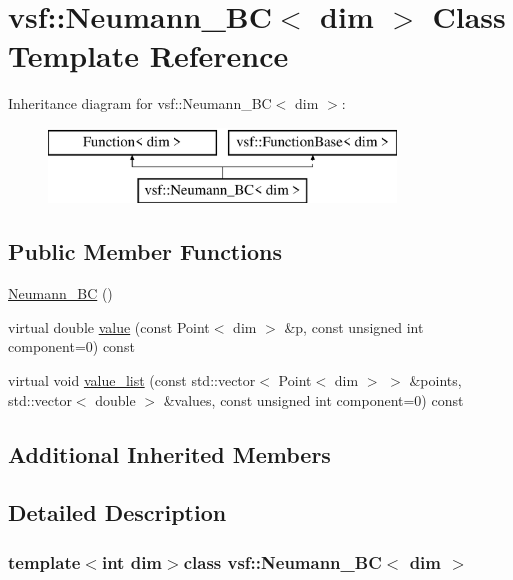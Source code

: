 \hypertarget{classvsf_1_1Neumann__BC}{\section{vsf\-:\-:Neumann\-\_\-\-B\-C$<$ dim $>$ Class Template Reference}
\label{classvsf_1_1Neumann__BC}
}
Inheritance diagram for vsf\-:\-:Neumann\-\_\-\-B\-C$<$ dim $>$\-:\begin{figure}[H]
\begin{center}
\leavevmode
\includegraphics[height=2.000000cm]{classvsf_1_1Neumann__BC}
\end{center}
\end{figure}
\subsection*{Public Member Functions}
\begin{DoxyCompactItemize}
\item 
\hyperlink{classvsf_1_1Neumann__BC_a8b36c26330ec21aa09f6887f1a49a329}{Neumann\-\_\-\-B\-C} ()
\item 
virtual double \hyperlink{classvsf_1_1Neumann__BC_addccdf65c1e5367b004289db3b0b96a5}{value} (const Point$<$ dim $>$ \&p, const unsigned int component=0) const 
\item 
virtual void \hyperlink{classvsf_1_1Neumann__BC_a2e1fe62899a58c70bbb4e9021858427e}{value\-\_\-list} (const std\-::vector$<$ Point$<$ dim $>$ $>$ \&points, std\-::vector$<$ double $>$ \&values, const unsigned int component=0) const 
\end{DoxyCompactItemize}
\subsection*{Additional Inherited Members}


\subsection{Detailed Description}
\subsubsection*{template$<$int dim$>$class vsf\-::\-Neumann\-\_\-\-B\-C$<$ dim $>$}

